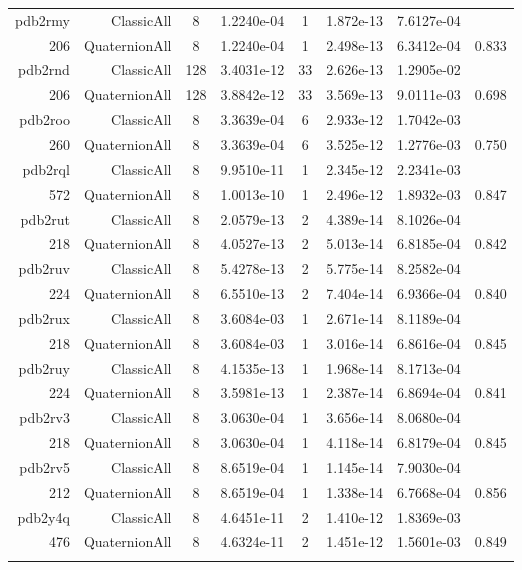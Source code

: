 \begin{xltabular}{\textwidth}{r|rcS[table-format=1.4e+2]cS[table-format=1.3e+2]S[table-format=1.4e+2]S[table-format=-1.3]}
pdb2rmy & ClassicAll & 8 & 1.2240e-04 & 1 & 1.872e-13 & 7.6127e-04 & \\
206 & QuaternionAll & 8 & 1.2240e-04 & 1 & 2.498e-13 & 6.3412e-04 & 0.833\\  \addlinespace
pdb2rnd & ClassicAll & 128 & 3.4031e-12 & 33 & 2.626e-13 & 1.2905e-02 & \\
206 & QuaternionAll & 128 & 3.8842e-12 & 33 & 3.569e-13 & 9.0111e-03 & 0.698\\  \addlinespace
pdb2roo & ClassicAll & 8 & 3.3639e-04 & 6 & 2.933e-12 & 1.7042e-03 & \\
260 & QuaternionAll & 8 & 3.3639e-04 & 6 & 3.525e-12 & 1.2776e-03 & 0.750\\  \addlinespace
pdb2rql & ClassicAll & 8 & 9.9510e-11 & 1 & 2.345e-12 & 2.2341e-03 & \\
572 & QuaternionAll & 8 & 1.0013e-10 & 1 & 2.496e-12 & 1.8932e-03 & 0.847\\  \addlinespace
pdb2rut & ClassicAll & 8 & 2.0579e-13 & 2 & 4.389e-14 & 8.1026e-04 & \\
218 & QuaternionAll & 8 & 4.0527e-13 & 2 & 5.013e-14 & 6.8185e-04 & 0.842\\  \addlinespace
pdb2ruv & ClassicAll & 8 & 5.4278e-13 & 2 & 5.775e-14 & 8.2582e-04 & \\
224 & QuaternionAll & 8 & 6.5510e-13 & 2 & 7.404e-14 & 6.9366e-04 & 0.840\\  \addlinespace
pdb2rux & ClassicAll & 8 & 3.6084e-03 & 1 & 2.671e-14 & 8.1189e-04 & \\
218 & QuaternionAll & 8 & 3.6084e-03 & 1 & 3.016e-14 & 6.8616e-04 & 0.845\\  \addlinespace
pdb2ruy & ClassicAll & 8 & 4.1535e-13 & 1 & 1.968e-14 & 8.1713e-04 & \\
224 & QuaternionAll & 8 & 3.5981e-13 & 1 & 2.387e-14 & 6.8694e-04 & 0.841\\  \addlinespace
pdb2rv3 & ClassicAll & 8 & 3.0630e-04 & 1 & 3.656e-14 & 8.0680e-04 & \\
218 & QuaternionAll & 8 & 3.0630e-04 & 1 & 4.118e-14 & 6.8179e-04 & 0.845\\  \addlinespace
pdb2rv5 & ClassicAll & 8 & 8.6519e-04 & 1 & 1.145e-14 & 7.9030e-04 & \\
212 & QuaternionAll & 8 & 8.6519e-04 & 1 & 1.338e-14 & 6.7668e-04 & 0.856\\  \addlinespace
pdb2y4q & ClassicAll & 8 & 4.6451e-11 & 2 & 1.410e-12 & 1.8369e-03 & \\
476 & QuaternionAll & 8 & 4.6324e-11 & 2 & 1.451e-12 & 1.5601e-03 & 0.849\\  \addlinespace
\end{xltabular}
